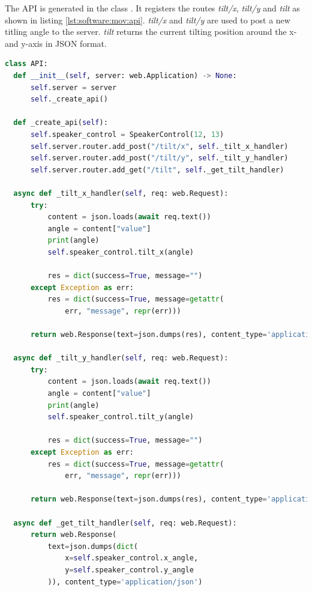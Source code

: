 The API is generated in the class . It registers the routes \textit{tilt/x}, \textit{tilt/y} and \textit{tilt} as shown in listing \ref{lst:software:mov:api}.
\textit{tilt/x} and \textit{tilt/y} are used to post a new titling angle to the server. \textit{tilt} returns the current tilting position around the x- and y-axis in JSON format.\p
%
\begin{mdframed}
\begin{lstlisting}[language=Python, caption=Control interface API, label=lst:software:mov:api]
class API:
  def __init__(self, server: web.Application) -> None:
      self.server = server
      self._create_api()

  def _create_api(self):
      self.speaker_control = SpeakerControl(12, 13)
      self.server.router.add_post("/tilt/x", self._tilt_x_handler)
      self.server.router.add_post("/tilt/y", self._tilt_y_handler)
      self.server.router.add_get("/tilt", self._get_tilt_handler)

  async def _tilt_x_handler(self, req: web.Request):
      try:
          content = json.loads(await req.text())
          angle = content["value"]
          print(angle)
          self.speaker_control.tilt_x(angle)

          res = dict(success=True, message="")
      except Exception as err:
          res = dict(success=True, message=getattr(
              err, "message", repr(err)))

      return web.Response(text=json.dumps(res), content_type='application/json')

  async def _tilt_y_handler(self, req: web.Request):
      try:
          content = json.loads(await req.text())
          angle = content["value"]
          print(angle)
          self.speaker_control.tilt_y(angle)

          res = dict(success=True, message="")
      except Exception as err:
          res = dict(success=True, message=getattr(
              err, "message", repr(err)))

      return web.Response(text=json.dumps(res), content_type='application/json')

  async def _get_tilt_handler(self, req: web.Request):
      return web.Response(
          text=json.dumps(dict(
              x=self.speaker_control.x_angle,
              y=self.speaker_control.y_angle
          )), content_type='application/json')
\end{lstlisting}
\end{mdframed}

